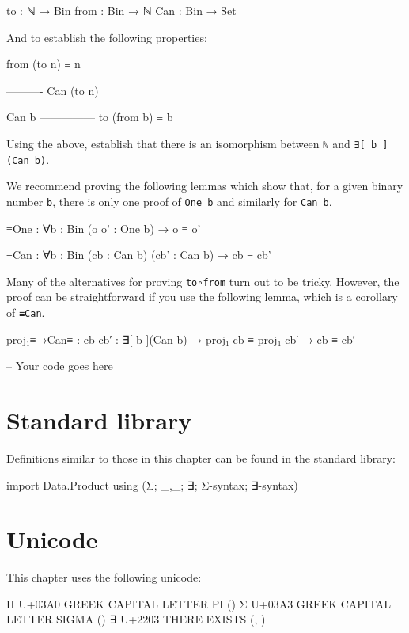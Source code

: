 \begin{myDisplay}
to   : ℕ → Bin
from : Bin → ℕ
Can  : Bin → Set
\end{myDisplay}

And to establish the following properties:

\begin{myDisplay}
from (to n) ≡ n

----------
Can (to n)

Can b
---------------
to (from b) ≡ b
\end{myDisplay}

Using the above, establish that there is an isomorphism between
\texttt{ℕ} and \texttt{∃{[}\ b\ {]}(Can\ b)}.

We recommend proving the following lemmas which show that, for a given
binary number \texttt{b}, there is only one proof of \texttt{One\ b} and
similarly for \texttt{Can\ b}.

\begin{myDisplay}
≡One : ∀{b : Bin} (o o' : One b) → o ≡ o'

≡Can : ∀{b : Bin} (cb : Can b) (cb' : Can b) → cb ≡ cb'
\end{myDisplay}

Many of the alternatives for proving \texttt{to∘from} turn out to be
tricky. However, the proof can be straightforward if you use the
following lemma, which is a corollary of \texttt{≡Can}.

\begin{myDisplay}
proj₁≡→Can≡ : {cb cb′ : ∃[ b ](Can b)} → proj₁ cb ≡ proj₁ cb′ → cb ≡ cb′
\end{myDisplay}

\begin{fence}
\begin{code}
-- Your code goes here
\end{code}
\end{fence}

\hypertarget{standard-library}{%
\section{Standard library}\label{standard-library}}

Definitions similar to those in this chapter can be found in the
standard library:

\begin{fence}
\begin{code}
import Data.Product using (Σ; _,_; ∃; Σ-syntax; ∃-syntax)
\end{code}
\end{fence}

\hypertarget{unicode}{%
\section{Unicode}\label{unicode}}

This chapter uses the following unicode:

\begin{myDisplay}
Π  U+03A0  GREEK CAPITAL LETTER PI (\Pi)
Σ  U+03A3  GREEK CAPITAL LETTER SIGMA (\Sigma)
∃  U+2203  THERE EXISTS (\ex, \exists)
\end{myDisplay}

